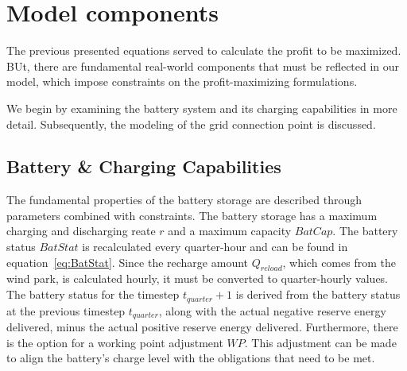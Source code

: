 
\section{Model components}
The previous presented equations served to calculate the profit to be maximized.
BUt, there are fundamental real-world components that must be reflected in our model,
which impose constraints on the profit-maximizing formulations.

We begin by examining the battery system and its charging capabilities in more detail.
Subsequently, the modeling of the grid connection point is discussed.

\subsection{Battery \& Charging Capabilities}
The fundamental properties of the battery storage are described through parameters combined with constraints.
The battery storage has a maximum charging and discharging reate $r$ and a maximum capacity $BatCap$.
The battery status $BatStat$ is recalculated every quarter-hour and can be found in equation~\ref{eq:BatStat}.
Since the recharge amount $Q_{reload}$, which comes from the wind park, is calculated hourly,
it must be converted to quarter-hourly values. The battery status for the timestep $t_{quarter} + 1$
is derived from the battery status at the previous timestep $t_{quarter}$, along with the actual negative reserve energy delivered,
minus the actual positive reserve energy delivered. Furthermore, there is the option for a working point adjustment $WP$.
This adjustment can be made to align the battery's charge level with the obligations that need to be met.

